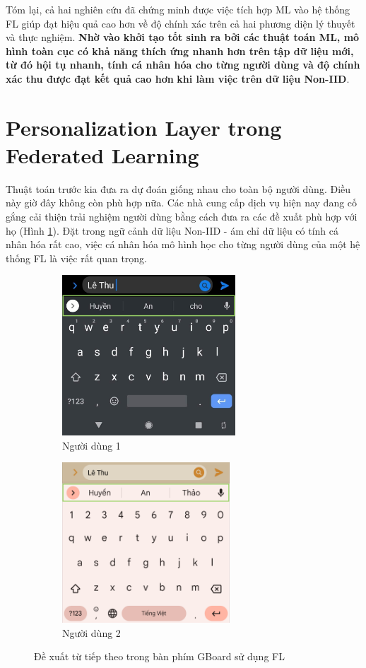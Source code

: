 Tóm lại, cả hai nghiên cứu \parencite{chen2018federated, fallah2020personalized} đã chứng minh được việc tích hợp ML vào hệ thống FL giúp đạt hiệu quả cao hơn  về độ chính xác trên cả hai phương diện lý thuyết và thực nghiệm. \textbf{Nhờ vào khởi tạo tốt sinh ra bởi các thuật toán ML, mô hình toàn cục có khả năng thích ứng nhanh hơn trên tập dữ liệu mới, từ đó hội tụ nhanh, tính cá nhân hóa cho từng người dùng và độ chính xác thu được đạt kết quả cao hơn}  \textbf{khi làm việc trên dữ liệu Non-IID}.

\section{Personalization Layer trong Federated Learning}

Thuật toán  trước kia đưa ra dự đoán giống nhau cho toàn bộ người dùng. Điều này giờ đây không còn phù hợp nữa. Các nhà cung cấp dịch vụ hiện nay đang cố gắng cải thiện trải nghiệm người dùng bằng cách đưa ra các đề xuất phù hợp với họ (Hình \ref{fig:gboard}). Đặt trong ngữ cảnh dữ liệu Non-IID - ám chỉ dữ liệu có tính cá nhân hóa rất cao, việc cá nhân hóa mô hình học cho từng người dùng của một hệ thống FL là việc rất quan trọng.

\begin{figure}[H]
    \centering
    \begin{subfigure}{.5\textwidth}
        \centering
        \includegraphics[height=6cm,keepaspectratio]{../images/gboard1.jpg}
        \caption{Người dùng 1}
    \end{subfigure}%
    \begin{subfigure}{.5\textwidth}
        \centering
        \includegraphics[height=6cm,keepaspectratio]{../images/gboard2.png}
        \caption{Người dùng 2}
    \end{subfigure}
    \caption{Đề xuất từ tiếp theo trong bàn phím GBoard sử dụng FL}
    \label{fig:gboard}
\end{figure}

